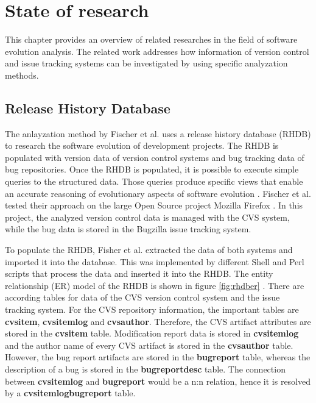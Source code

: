 \section{State of research}
\label{sec:state_of_research}
This chapter provides an overview of related researches in the field of software evolution analysis. The related work addresses how information of version control and issue tracking systems can be investigated by using specific analyzation methods.

\subsection{Release History Database}
The anlayzation method by Fischer et al. \cite{fischer2003populating} uses a release history database (RHDB) to research the software evolution of development projects. The RHDB is populated with version data of version control systems and bug tracking data of bug repositories. Once the RHDB is populated, it is possible to execute simple queries to the structured data. Those queries produce specific views that enable an accurate reasoning of evolutionary aspects of software evolution \cite{fischer2003populating}.
Fischer et al. tested their approach on the large Open Source project Mozilla Firefox \cite{mozilla}. In this project, the analyzed version control data is managed with the CVS \cite{cvs} system, while the bug data is stored in the Bugzilla \cite{bugzilla} issue tracking system. 

To populate the RHDB, Fisher et al. extracted the data of both systems and imported it into the database. This was implemented by different Shell and Perl scripts that process the data and inserted it into the RHDB. The entity relationship (ER) model of the RHDB is shown in figure \ref{fig:rhdber} \cite{fischer2003populating}. There are according tables for data of the CVS version control system and the issue tracking system. For the CVS repository information, the important tables are \textbf{cvsitem}, \textbf{cvsitemlog} and \textbf{cvsauthor}. Therefore, the CVS artifact attributes are stored in the \textbf{cvsitem} table. Modification report data is stored in \textbf{cvsitemlog} and the author name of every CVS artifact is stored in the \textbf{cvsauthor} table. However, the bug report artifacts are stored in the \textbf{bugreport} table, whereas the description of a bug is stored in the \textbf{bugreportdesc} table. The connection between \textbf{cvsitemlog} and \textbf{bugreport} would be a n:n relation, hence it is resolved by a \textbf{cvsitemlogbugreport} table.

